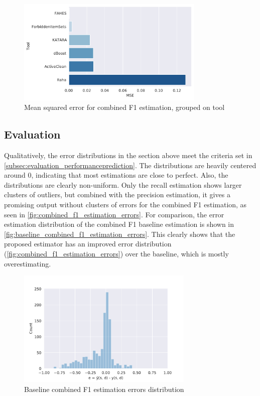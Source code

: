 \begin{figure}[H]
    \centering
    \includegraphics[width=0.8\textwidth]{thesis/Figures/RQ2/15_tools_combined_f1.pdf}
    \caption{Mean squared error for combined F1 estimation, grouped on tool}
    \label{fig:mse_combined_f1_tool}
\end{figure}


\subsection{Evaluation}
\label{subsec:results_prediction_evaluation}
Qualitatively, the error distributions in the section above meet the criteria set in \autoref{subsec:evaluation_performanceprediction}. The distributions are heavily centered around 0, indicating that most estimations are close to perfect. Also, the distributions are clearly non-uniform. Only the recall estimation shows larger clusters of outliers, but combined with the precision estimation, it gives a promising output without clusters of errors for the combined F1 estimation, as seen in \autoref{fig:combined_f1_estimation_errors}. For comparison, the error estimation distribution of the combined F1 baseline estimation is shown in \autoref{fig:baseline_combined_f1_estimation_errors}. This clearly shows that the proposed estimator has an improved error distribution (\autoref{fig:combined_f1_estimation_errors}) over the baseline, which is mostly overestimating. 

\begin{figure}[h]
    \centering
    \includegraphics[width=0.75\textwidth]{thesis/Figures/RQ2/15_average_estimator_error_histogramcell_f1_combined.pdf}
    \caption{Baseline combined F1 estimation errors distribution}
    \label{fig:baseline_combined_f1_estimation_errors}
\end{figure}

